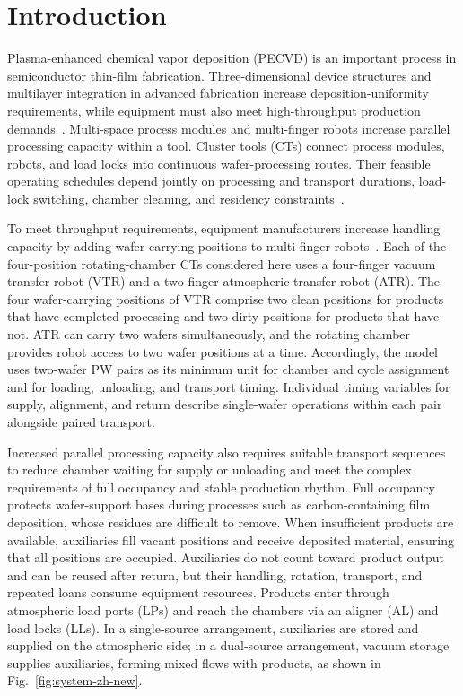 \documentclass[final,5p,times,twocolumn]{elsarticle}
\begin{document}
\section{Introduction}
Plasma-enhanced chemical vapor deposition (PECVD) is an important process in semiconductor thin-film fabrication. Three-dimensional device structures and multilayer integration in advanced fabrication increase deposition-uniformity requirements, while equipment must also meet high-throughput production demands~\citep{appliedprecisioncvd}. Multi-space process modules and multi-finger robots increase parallel processing capacity within a tool. Cluster tools (CTs) connect process modules, robots, and load locks into continuous wafer-processing routes. Their feasible operating schedules depend jointly on processing and transport durations, load-lock switching, chamber cleaning, and residency constraints~\citep{pan2018survey}.

To meet throughput requirements, equipment manufacturers increase handling capacity by adding wafer-carrying positions to multi-finger robots~\citep{gu2024applied,gu2024multifinger}. Each of the four-position rotating-chamber CTs considered here uses a four-finger vacuum transfer robot (VTR) and a two-finger atmospheric transfer robot (ATR). The four wafer-carrying positions of VTR comprise two clean positions for products that have completed processing and two dirty positions for products that have not. ATR can carry two wafers simultaneously, and the rotating chamber provides robot access to two wafer positions at a time. Accordingly, the model uses two-wafer PW pairs as its minimum unit for chamber and cycle assignment and for loading, unloading, and transport timing. Individual timing variables for supply, alignment, and return describe single-wafer operations within each pair alongside paired transport.

Increased parallel processing capacity also requires suitable transport sequences to reduce chamber waiting for supply or unloading and meet the complex requirements of full occupancy and stable production rhythm. Full occupancy protects wafer-support bases during processes such as carbon-containing film deposition, whose residues are difficult to remove. When insufficient products are available, auxiliaries fill vacant positions and receive deposited material, ensuring that all positions are occupied. Auxiliaries do not count toward product output and can be reused after return, but their handling, rotation, transport, and repeated loans consume equipment resources. Products enter through atmospheric load ports (LPs) and reach the chambers via an aligner (AL) and load locks (LLs). In a single-source arrangement, auxiliaries are stored and supplied on the atmospheric side; in a dual-source arrangement, vacuum storage supplies auxiliaries, forming mixed flows with products, as shown in Fig.~\ref{fig:system-zh-new}.
\end{document}
